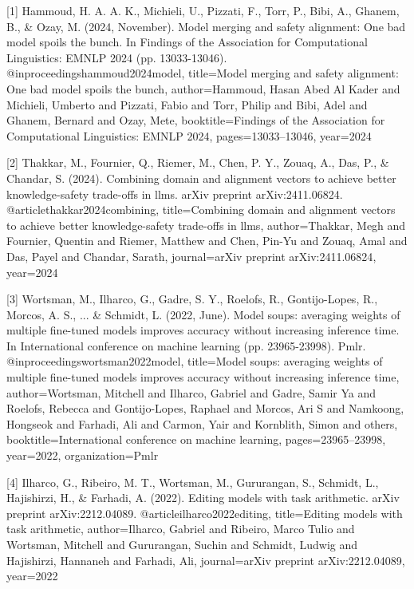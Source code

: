 \documentclass{article}
\begin{document}
{
\small
[1] Hammoud, H. A. A. K., Michieli, U., Pizzati, F., Torr, P., Bibi, A., Ghanem, B., & Ozay, M. (2024, November). Model merging and safety alignment: One bad model spoils the bunch. In Findings of the Association for Computational Linguistics: EMNLP 2024 (pp. 13033-13046).
@inproceedings{hammoud2024model,
  title={Model merging and safety alignment: One bad model spoils the bunch},
  author={Hammoud, Hasan Abed Al Kader and Michieli, Umberto and Pizzati, Fabio and Torr, Philip and Bibi, Adel and Ghanem, Bernard and Ozay, Mete},
  booktitle={Findings of the Association for Computational Linguistics: EMNLP 2024},
  pages={13033--13046},
  year={2024}
}

[2] Thakkar, M., Fournier, Q., Riemer, M., Chen, P. Y., Zouaq, A., Das, P., & Chandar, S. (2024). Combining domain and alignment vectors to achieve better knowledge-safety trade-offs in llms. arXiv preprint arXiv:2411.06824.
@article{thakkar2024combining,
  title={Combining domain and alignment vectors to achieve better knowledge-safety trade-offs in llms},
  author={Thakkar, Megh and Fournier, Quentin and Riemer, Matthew and Chen, Pin-Yu and Zouaq, Amal and Das, Payel and Chandar, Sarath},
  journal={arXiv preprint arXiv:2411.06824},
  year={2024}
}

[3] Wortsman, M., Ilharco, G., Gadre, S. Y., Roelofs, R., Gontijo-Lopes, R., Morcos, A. S., ... & Schmidt, L. (2022, June). Model soups: averaging weights of multiple fine-tuned models improves accuracy without increasing inference time. In International conference on machine learning (pp. 23965-23998). Pmlr.
@inproceedings{wortsman2022model,
  title={Model soups: averaging weights of multiple fine-tuned models improves accuracy without increasing inference time},
  author={Wortsman, Mitchell and Ilharco, Gabriel and Gadre, Samir Ya and Roelofs, Rebecca and Gontijo-Lopes, Raphael and Morcos, Ari S and Namkoong, Hongseok and Farhadi, Ali and Carmon, Yair and Kornblith, Simon and others},
  booktitle={International conference on machine learning},
  pages={23965--23998},
  year={2022},
  organization={Pmlr}
}

[4] Ilharco, G., Ribeiro, M. T., Wortsman, M., Gururangan, S., Schmidt, L., Hajishirzi, H., & Farhadi, A. (2022). Editing models with task arithmetic. arXiv preprint arXiv:2212.04089.
@article{ilharco2022editing,
  title={Editing models with task arithmetic},
  author={Ilharco, Gabriel and Ribeiro, Marco Tulio and Wortsman, Mitchell and Gururangan, Suchin and Schmidt, Ludwig and Hajishirzi, Hannaneh and Farhadi, Ali},
  journal={arXiv preprint arXiv:2212.04089},
  year={2022}
}

}
\end{document}
